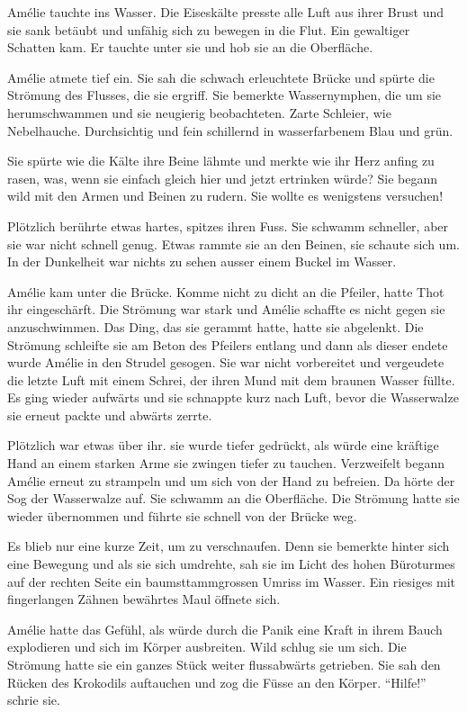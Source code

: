 \documentclass[11pt,titlepage,a5paper]{book}
\begin{document}
Amélie tauchte ins Wasser. Die Eiseskälte presste alle Luft aus ihrer Brust und sie sank betäubt und unfähig sich zu bewegen in die Flut. Ein gewaltiger Schatten kam. Er tauchte unter sie und hob sie an die Oberfläche.

Amélie atmete tief ein. Sie sah die schwach erleuchtete Brücke und spürte die Strömung des Flusses, die sie ergriff. Sie bemerkte Wassernymphen, die um sie herumschwammen und sie neugierig beobachteten. Zarte Schleier, wie Nebelhauche. Durchsichtig und fein schillernd in wasserfarbenem Blau und grün. 

Sie spürte wie die Kälte ihre Beine lähmte und merkte wie ihr Herz anfing zu rasen, was, wenn sie einfach gleich hier und jetzt ertrinken würde? Sie begann wild mit den Armen und Beinen zu rudern. Sie wollte es wenigstens versuchen!

Plötzlich berührte etwas hartes, spitzes ihren Fuss. Sie schwamm schneller,  aber sie war nicht schnell genug. Etwas rammte sie an den Beinen, sie schaute sich um. In der Dunkelheit war nichts zu sehen ausser einem Buckel im Wasser.

Amélie kam unter die Brücke. Komme nicht zu dicht an die Pfeiler, hatte Thot ihr eingeschärft. Die Strömung war stark und Amélie schaffte es nicht gegen sie anzuschwimmen. Das Ding, das sie gerammt hatte, hatte sie abgelenkt. Die Strömung schleifte sie am Beton des Pfeilers entlang und dann als dieser endete wurde Amélie in den Strudel gesogen. Sie war nicht vorbereitet und vergeudete die letzte Luft mit einem Schrei, der ihren Mund mit dem braunen Wasser füllte. Es ging wieder aufwärts und sie schnappte kurz nach Luft, bevor die Wasserwalze sie erneut packte und abwärts zerrte.

Plötzlich war etwas über ihr. sie wurde tiefer gedrückt, als würde eine kräftige Hand an einem starken Arme sie zwingen tiefer zu tauchen. Verzweifelt begann Amélie erneut zu strampeln und um sich von der Hand zu befreien. Da hörte der Sog der Wasserwalze auf. Sie schwamm an die Oberfläche. Die Strömung hatte sie wieder übernommen und führte sie schnell von der Brücke weg.

Es blieb nur eine kurze Zeit, um zu verschnaufen. Denn sie bemerkte hinter sich eine Bewegung und als sie sich umdrehte, sah sie im Licht des hohen Büroturmes auf der rechten Seite ein baumsttammgrossen Umriss im Wasser. Ein riesiges mit fingerlangen Zähnen bewährtes Maul öffnete sich. 

Amélie hatte das Gefühl, als würde durch die Panik eine Kraft in ihrem Bauch explodieren und sich im Körper ausbreiten. Wild schlug sie um sich. Die Strömung hatte sie ein ganzes Stück weiter flussabwärts getrieben. Sie sah den Rücken des Krokodils auftauchen und zog die Füsse an den Körper. "`Hilfe!"' schrie sie. 
\end{document}
